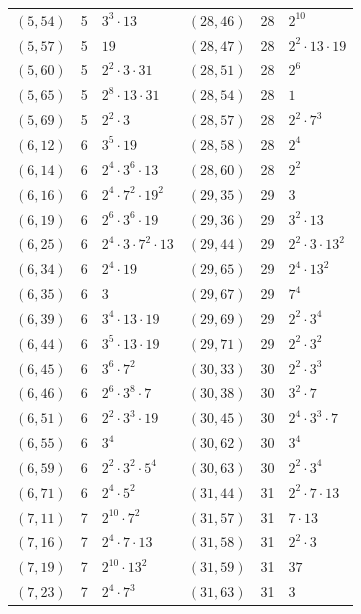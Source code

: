\documentclass[11pt]{article}
\begin{document}
\begin{longtable}{@{}lrl@{\qquad}lrl@{}}
$(5,54)$ & 5 & $3^{3}\cdot 13$ & $(28,46)$ & 28 & $2^{10}$\\
$(5,57)$ & 5 & $19$ & $(28,47)$ & 28 & $2^{2}\cdot 13\cdot 19$\\
$(5,60)$ & 5 & $2^{2}\cdot 3\cdot 31$ & $(28,51)$ & 28 & $2^{6}$\\
$(5,65)$ & 5 & $2^{8}\cdot 13\cdot 31$ & $(28,54)$ & 28 & $1$\\
$(5,69)$ & 5 & $2^{2}\cdot 3$ & $(28,57)$ & 28 & $2^{2}\cdot 7^{3}$\\
$(6,12)$ & 6 & $3^{5}\cdot 19$ & $(28,58)$ & 28 & $2^{4}$\\
$(6,14)$ & 6 & $2^{4}\cdot 3^{6}\cdot 13$ & $(28,60)$ & 28 & $2^{2}$\\
$(6,16)$ & 6 & $2^{4}\cdot 7^{2}\cdot 19^{2}$ & $(29,35)$ & 29 & $3$\\
$(6,19)$ & 6 & $2^{6}\cdot 3^{6}\cdot 19$ & $(29,36)$ & 29 & $3^{2}\cdot 13$\\
$(6,25)$ & 6 & $2^{4}\cdot 3\cdot 7^{2}\cdot 13$ & $(29,44)$ & 29 & $2^{2}\cdot 3\cdot 13^{2}$\\
$(6,34)$ & 6 & $2^{4}\cdot 19$ & $(29,65)$ & 29 & $2^{4}\cdot 13^{2}$\\
$(6,35)$ & 6 & $3$ & $(29,67)$ & 29 & $7^{4}$\\
$(6,39)$ & 6 & $3^{4}\cdot 13\cdot 19$ & $(29,69)$ & 29 & $2^{2}\cdot 3^{4}$\\
$(6,44)$ & 6 & $3^{5}\cdot 13\cdot 19$ & $(29,71)$ & 29 & $2^{2}\cdot 3^{2}$\\
$(6,45)$ & 6 & $3^{6}\cdot 7^{2}$ & $(30,33)$ & 30 & $2^{2}\cdot 3^{3}$\\
$(6,46)$ & 6 & $2^{6}\cdot 3^{8}\cdot 7$ & $(30,38)$ & 30 & $3^{2}\cdot 7$\\
$(6,51)$ & 6 & $2^{2}\cdot 3^{3}\cdot 19$ & $(30,45)$ & 30 & $2^{4}\cdot 3^{3}\cdot 7$\\
$(6,55)$ & 6 & $3^{4}$ & $(30,62)$ & 30 & $3^{4}$\\
$(6,59)$ & 6 & $2^{2}\cdot 3^{2}\cdot 5^{4}$ & $(30,63)$ & 30 & $2^{2}\cdot 3^{4}$\\
$(6,71)$ & 6 & $2^{4}\cdot 5^{2}$ & $(31,44)$ & 31 & $2^{2}\cdot 7\cdot 13$\\
$(7,11)$ & 7 & $2^{10}\cdot 7^{2}$ & $(31,57)$ & 31 & $7\cdot 13$\\
$(7,16)$ & 7 & $2^{4}\cdot 7\cdot 13$ & $(31,58)$ & 31 & $2^{2}\cdot 3$\\
$(7,19)$ & 7 & $2^{10}\cdot 13^{2}$ & $(31,59)$ & 31 & $37$\\
$(7,23)$ & 7 & $2^{4}\cdot 7^{3}$ & $(31,63)$ & 31 & $3$\\

\end{longtable}
\end{document}
